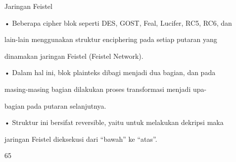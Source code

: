 \documentclass{article}
\begin{document}

Jaringan Feistel

• Beberapa cipher blok seperti DES, GOST, Feal, Lucifer, RC5, RC6, dan 

lain-lain menggunakan struktur enciphering pada setiap putaran yang 

dinamakan jaringan Feistel (Feistel Network).

• Dalam hal ini, blok plainteks dibagi menjadi dua bagian, dan pada 

masing-masing bagian dilakukan proses transformasi menjadi upa-

bagian pada putaran selanjutnya. 

• Struktur ini bersifat reversible, yaitu untuk melakukan dekripsi maka 

jaringan Feistel dieksekusi dari “bawah” ke “atas”. 

65
\end{document}
